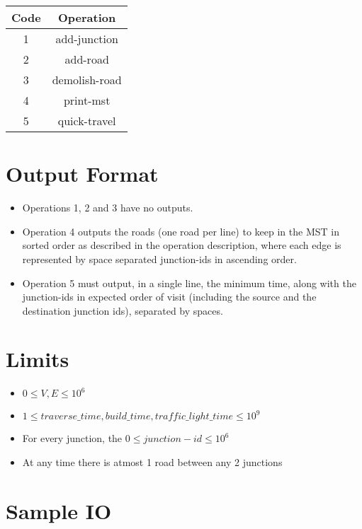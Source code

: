 \documentclass[20pt]{article}
\begin{document}
\begin{center}
\begin{tabular}{|c|c|}
\hline 
\textbf{Code} & \textbf{Operation} \\
\hline 
1 & add-junction \\ 
\hline 
2 & add-road \\ 
\hline 
3 & demolish-road \\ 
\hline 
4 & print-mst \\ 
\hline 
5 & quick-travel \\ 
\hline 
\end{tabular} 
\end{center}
\section{Output Format}
\begin{itemize}
\item Operations 1, 2 and 3 have no outputs.
\item Operation 4 outputs the roads (one road per line) to keep in the MST in sorted order as described in the operation description, where each edge is represented by space separated junction-ids in ascending order.
\item Operation 5 must output, in a single line, the minimum time, along with the junction-ids in expected order of visit (including the source and the destination junction ids), separated by spaces.
\end{itemize}

\section{Limits}
\begin{itemize}
\item $0 \leq V, E \leq 10^6$
\item $1 \leq traverse\_time, build\_time, traffic\_light\_time \leq 10^9$
\item For every junction, the $0 \leq junction-id \leq 10^6$
\item At any time there is atmost 1 road between any 2 junctions
\end{itemize}


\section{Sample IO}
\end{document}
